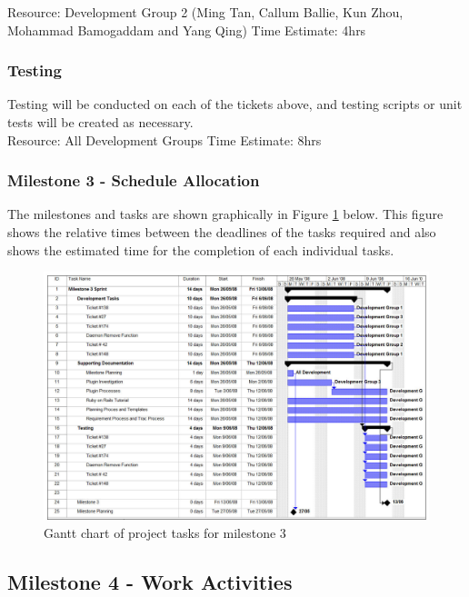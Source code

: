 \documentclass{article}
\begin{document}
	Resource: Development Group 2 (Ming Tan, Callum Ballie, Kun Zhou, Mohammad Bamogaddam and Yang Qing)
	Time Estimate: 4hrs

\subsubsection{Testing}
	Testing will be conducted on each of the tickets above, and testing scripts or unit tests will be created as necessary.\\
	
	Resource: All Development Groups
	Time Estimate: 8hrs

\subsubsection{Milestone 3 - Schedule Allocation}

The milestones and tasks are shown graphically in Figure \ref{fig:schedule3} below. This figure shows the relative times between the deadlines of the tasks required and also shows the estimated time for the completion of each individual tasks.\\

\begin{figure}[htp]
\begin{centering}
\includegraphics[angle=90,scale=0.5]{./schedule-milestone3.jpg} 
\par\end{centering}
\caption{Gantt chart of project tasks for milestone 3}
\label{fig:schedule3} 
\end{figure}

\subsection{Milestone 4 - Work Activities}
\end{document}

